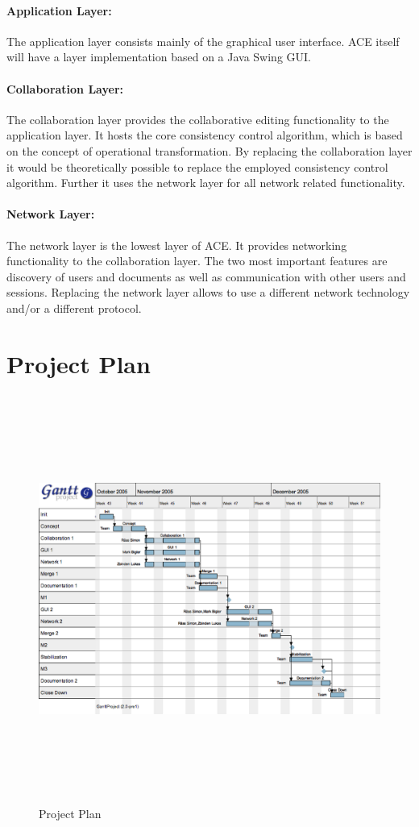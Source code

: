 \documentclass[11pt,a4paper]{article}
\begin{document}
\paragraph{Application Layer:} The application layer consists mainly of the graphical
user interface. ACE itself will have a layer implementation based on a Java Swing GUI.

\paragraph{Collaboration Layer:} The collaboration layer provides the collaborative
editing functionality to the application layer. It hosts the core consistency
control algorithm, which is based on the concept of operational transformation.
By replacing the collaboration layer it would be theoretically possible to replace
the employed consistency control algorithm. Further it uses the network layer
for all network related functionality.

\paragraph{Network Layer:} The network layer is the lowest layer of ACE. It provides
networking functionality to the collaboration layer. The two most important features
are discovery of users and documents as well as communication with other users and
sessions. Replacing the network layer allows to use a different network technology 
and/or a different protocol.


\section{Project Plan}

\begin{figure}[H]
 \centering
 \includegraphics[height=379pt,width=585pt,angle=90]{../images/projectmanagement/gantt.eps}
 \caption{Project Plan}
\end{figure}
\newpage
\end{document}

